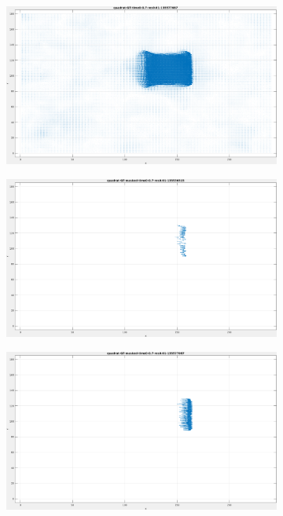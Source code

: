 \begin{appendix}
\begin{figure}[tb]
\begin{subfigure}{.45\textwidth}
  \caption{}
\end{subfigure}
\begin{subfigure}{.45\textwidth}
  \centering
  \includegraphics[height=.6\linewidth]{figs/quadrat/quadrat-GT-2.png}
  \caption{}
\end{subfigure}
\begin{subfigure}{.45\textwidth}
  \centering
  \includegraphics[height=.6\linewidth]{figs/quadrat/quadrat-GT-masked-1.png}
  \caption{}
\end{subfigure}
\begin{subfigure}{.45\textwidth}
  \centering
  \includegraphics[height=.6\linewidth]{figs/quadrat/quadrat-GT-masked-2.png}

\end{subfigure}
\end{figure}
\end{appendix}
